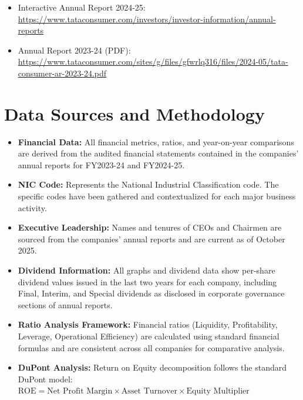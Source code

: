 \documentclass[12pt, a4paper]{report}
\begin{document}
\begin{itemize}
    \item Interactive Annual Report 2024-25: \url{https://www.tataconsumer.com/investors/investor-information/annual-reports}
    
    \item Annual Report 2023-24 (PDF): \url{https://www.tataconsumer.com/sites/g/files/gfwrlq316/files/2024-05/tata-consumer-ar-2023-24.pdf}
\end{itemize}

\section{Data Sources and Methodology}

\begin{itemize}
    \item \textbf{Financial Data:} All financial metrics, ratios, and year-on-year comparisons are derived from the audited financial statements contained in the companies' annual reports for FY2023-24 and FY2024-25.
    
    \item \textbf{NIC Code:} Represents the National Industrial Classification code. The specific codes have been gathered and contextualized for each major business activity.
    
    \item \textbf{Executive Leadership:} Names and tenures of CEOs and Chairmen are sourced from the companies' annual reports and are current as of October 2025.
    
    \item \textbf{Dividend Information:} All graphs and dividend data show per-share dividend values issued in the last two years for each company, including Final, Interim, and Special dividends as disclosed in corporate governance sections of annual reports.
    
    \item \textbf{Ratio Analysis Framework:} Financial ratios (Liquidity, Profitability, Leverage, Operational Efficiency) are calculated using standard financial formulas and are consistent across all companies for comparative analysis.
    
    \item \textbf{DuPont Analysis:} Return on Equity decomposition follows the standard DuPont model: $\text{ROE} = \text{Net Profit Margin} \times \text{Asset Turnover} \times \text{Equity Multiplier}$
\end{itemize}
\end{document}
